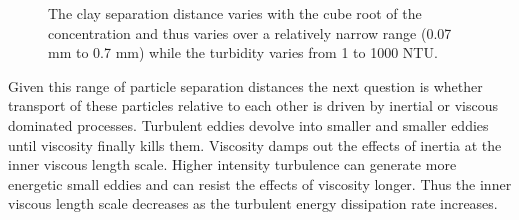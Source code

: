 \documentclass[letterpaper,10pt,english]{sphinxmanual}
\let\sphinxpxdimen\pdfpxdimen\else\newdimen\sphinxpxdimen
\begin{document}
%
\begin{sphinxVerbatim}[commandchars=\\\{\}]
  
  
   
  
   
 
\end{sphinxVerbatim}

\begin{figure}[htbp]
\centering
\capstart

\noindent\sphinxincludegraphics[width=400\sphinxpxdimen]{{LambdaClay_vs_CClay}.png}
\caption{The clay separation distance varies with the cube root of the concentration and thus varies over a relatively narrow range (0.07 mm to 0.7 mm) while the turbidity varies from 1 to 1000 NTU.}\label{\detokenize{Flocculation/Floc_Model:id34}}\label{\detokenize{Flocculation/Floc_Model:figure-lambdaclay-vs-cclay}}\end{figure}

Given this range of particle separation distances the next question is whether transport of these particles relative to each other is driven by inertial or viscous dominated processes. Turbulent eddies devolve into smaller and smaller eddies until viscosity finally kills them. Viscosity damps out the effects of inertia at the inner viscous length scale.  Higher intensity turbulence can generate more energetic small eddies and can resist the effects of viscosity longer. Thus the inner viscous length scale decreases as the turbulent energy dissipation rate increases.
\end{document}
